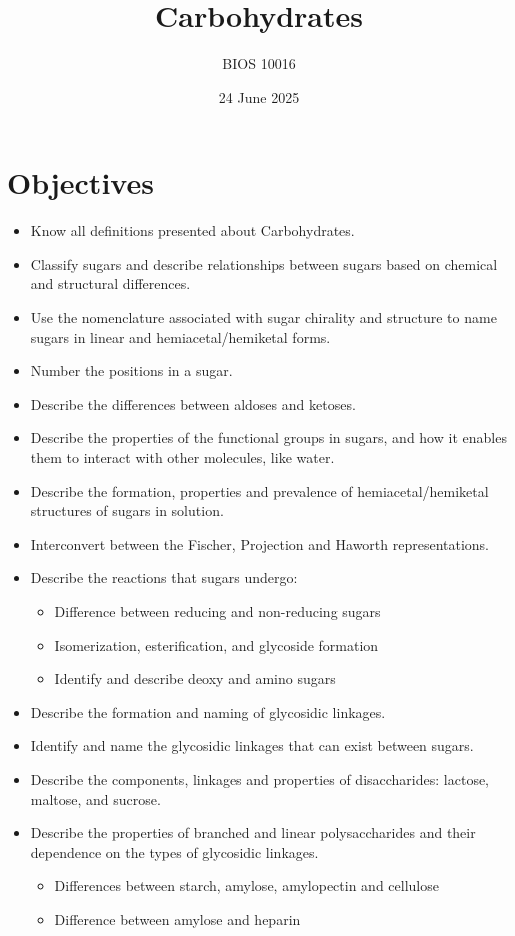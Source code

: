 \documentclass[letterpaper, 12pt]{article}
\title{Carbohydrates}
\author{BIOS 10016}
\date{24 June 2025}
\begin{document}
\maketitle

\section*{Objectives}

\begin{itemize}
\item Know all definitions presented about Carbohydrates.
\item Classify sugars and describe relationships between sugars based on chemical and structural differences.
\item Use the nomenclature associated with sugar chirality and structure to name sugars in linear and hemiacetal/hemiketal forms.
\item Number the positions in a sugar.
\item Describe the differences between aldoses and ketoses.
\item Describe the properties of the functional groups in sugars, and how it enables them to interact with other molecules, like water.
\item Describe the formation, properties and prevalence of hemiacetal/hemiketal structures of sugars in solution.
\item Interconvert between the Fischer, Projection and Haworth representations.
\item Describe the reactions that sugars undergo:
\begin{itemize}
\item Difference between reducing and non-reducing sugars
\item Isomerization, esterification, and glycoside formation
\item Identify and describe deoxy and amino sugars
\end{itemize}
\item Describe the formation and naming of glycosidic linkages.
\item Identify and name the glycosidic linkages that can exist between sugars.
\item Describe the components, linkages and properties of disaccharides: lactose, maltose, and sucrose.
\item Describe the properties of branched and linear polysaccharides and their
dependence on the types of glycosidic linkages.
\begin{itemize}
\item Differences between starch, amylose, amylopectin and cellulose
\item Difference between amylose and heparin
\end{itemize}
\end{itemize}
\end{document}
